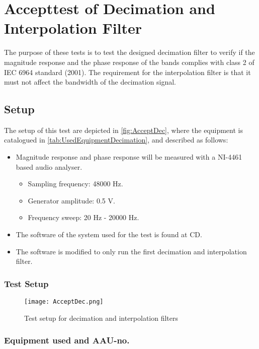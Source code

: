 \chapter{Accepttest of Decimation and Interpolation Filter}\label{app:journal_decimationFilter}
The purpose of these tests is to test the designed decimation filter to verify if the magnitude response and the phase response of the bands complies with class 2 of IEC 6964 standard (2001). The requirement for the interpolation filter is that it must not affect the bandwidth of the decimation signal.


\section{Setup}
The setup of this test are depicted in \autoref{fig:AcceptDec}, where the equipment is catalogued in \autoref{tab:UsedEquipmentDecimation}, and described as follows:

\begin{itemize}\addtolength{\itemsep}{-.35\baselineskip} 
\item Magnitude response and phase response will be measured with a NI-4461 based audio analyser. 
\begin{itemize}\addtolength{\itemsep}{-.35\baselineskip} 
\item Sampling frequency: 48000 Hz.
\item Generator amplitude: 0.5 V.
\item Frequency sweep: 20 Hz - 20000 Hz.
\end{itemize}
\item The software of the system used for the test is found at CD. 
\item The software is modified to only run the first decimation and interpolation filter.
\end{itemize}


\subsection*{Test Setup}
\begin{figure}[H]
\centering
\texttt{[image: AcceptDec.png]}
\caption{Test setup for decimation and interpolation filters}
\label{fig:AcceptDec}
\end{figure}

\subsection*{Equipment used and AAU-no.}

